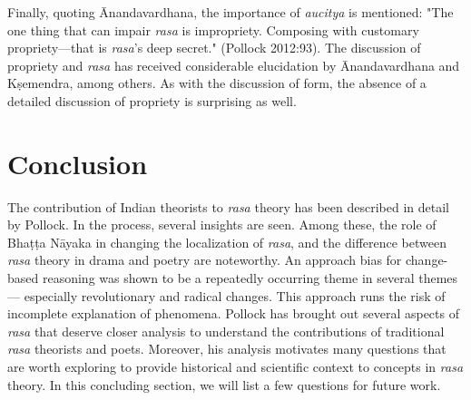Finally, quoting Ānandavardhana, the importance of \textsl{aucitya} is mentioned: "The one thing that can impair \textsl{rasa} is impropriety. Composing with customary propriety—that is \textsl{rasa}’s deep secret." (Pollock 2012:93). The discussion of propriety and \textsl{rasa} has received considerable elucidation by Ānandavardhana and Kṣemendra, among others. As with the discussion of form, the absence of a detailed discussion of propriety is surprising as well. 

\section*{Conclusion}

The contribution of Indian theorists to \textsl{rasa} theory has been described in detail by Pollock. In the process, several insights are seen. Among these, the role of Bhaṭṭa Nāyaka in changing the localization of \textsl{rasa}, and the difference between \textsl{rasa} theory in drama and poetry are noteworthy. An approach bias for change-based reasoning was shown to be a repeatedly occurring theme in several themes --- especially revolutionary and radical changes. This approach runs the risk of incomplete explanation of phenomena. Pollock has brought out several aspects of \textsl{rasa} that deserve closer analysis to understand the contributions of traditional \textsl{rasa} theorists and poets. Moreover, his analysis motivates many questions that are worth exploring to provide historical and scientific context to concepts in \textsl{rasa} theory. In this concluding section, we will list a few questions for future work. 
